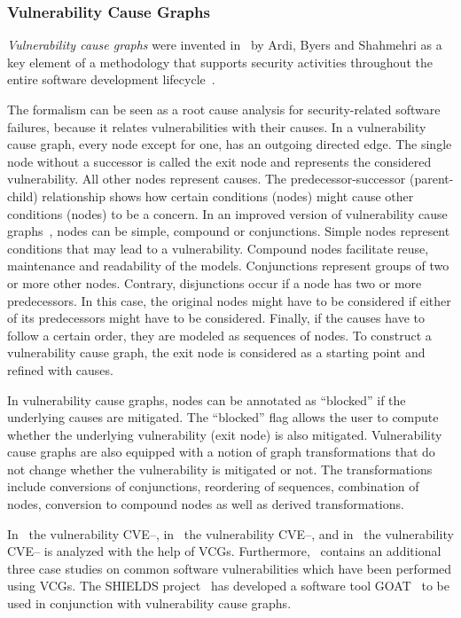 \documentclass[a4paper]{article}
\begin{document}
\subsubsection{Vulnerability Cause Graphs} 
\label{sec:vulnerability_cause_graphs}

\emph{Vulnerability cause graphs} were invented in~ by Ardi, Byers and
Shahmehri as a key element of a methodology that supports security activities
throughout the entire software development lifecycle~\cite{ArBySh}.

The formalism can be seen as a root cause analysis for security-related software
failures, because it relates vulnerabilities with their causes. In a
vulnerability cause graph, every node except for one, has an outgoing directed
edge. The single node without a successor is called the exit node and represents
the considered vulnerability. All other nodes represent causes. The
predecessor-successor (parent-child) relationship shows how certain conditions
(nodes) might cause other conditions (nodes) to be a concern. In an improved
version of vulnerability cause graphs~\cite{ByArShDu}, nodes can be simple,
compound or conjunctions. Simple nodes represent conditions that may lead to a 
vulnerability. Compound nodes facilitate reuse, maintenance and readability of 
the models. Conjunctions represent groups of two or more other nodes. Contrary,
disjunctions occur if a node has two or more predecessors. In this case, the
original nodes might have to be considered if either of its predecessors might
have to be considered. Finally, if the causes have to follow a certain order,
they are modeled as sequences of nodes. To construct a vulnerability cause
graph, the exit node is considered as a starting point and refined with causes.

In vulnerability cause graphs, nodes can be annotated as ``blocked'' if the
underlying causes are mitigated. The ``blocked'' flag allows the user to compute
whether the underlying vulnerability (exit node) is also mitigated.
Vulnerability cause graphs are also equipped with a notion of graph
transformations that do not change whether the vulnerability is mitigated or
not. The transformations include conversions of conjunctions, reordering of
sequences, combination of nodes, conversion to compound nodes as well as derived
transformations.

In~\cite{ByArShDu} the vulnerability CVE--, in~\cite{BySh3} the 
vulnerability CVE--, and  in~\cite{MaCaMoArBySh} the vulnerability
CVE-- is analyzed with the help of VCGs. Furthermore,~\cite{ChHa}
contains an additional three case studies on common software vulnerabilities
which have been performed using VCGs. The SHIELDS project~\cite{Website_SHIELDS}
has developed a software tool GOAT~\cite{GOAT} to be used in conjunction with
vulnerability cause graphs.
\end{document}
